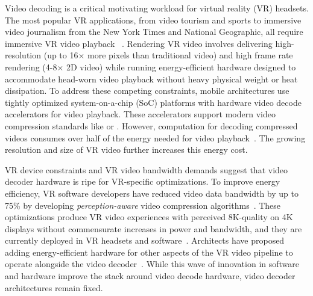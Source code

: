 
Video decoding is a critical motivating workload for virtual reality (VR) headsets.
The most popular VR applications, from \threesixty video tourism and sports to immersive video journalism from the New York Times and National Geographic, all require immersive VR video playback ~\cite{nytvr,nationalgeographic-vr}.
Rendering VR video involves delivering high-resolution (up to 16$\times$ more pixels than traditional video) and high frame rate rendering (4-8$\times$ 2D video) while running energy-efficient hardware designed to accommodate head-worn video playback without heavy physical weight or heat dissipation.
To address these competing constraints, mobile architectures use tightly optimized system-on-a-chip (SoC) platforms with hardware video decode accelerators for video playback.
These accelerators support modern video compression standards like \hevc or \vpnine.
However, computation for decoding compressed videos consumes over half of the energy needed for video playback~\cite{google2018asplos,hevcThesis}.
The growing resolution and size of VR video further increases this energy cost.

\foveatedExampleFigure

VR device constraints and VR video bandwidth demands suggest that video decoder hardware is ripe for VR-specific optimizations.
To improve energy efficiency, VR software developers have reduced video data bandwidth by up to 75\% by developing \emph{perception-aware} video compression algorithms~\cite{guenter2012foveated,patney2017perceptual, visualcloud2017haynes,rubiks,fov-cloud-ryoo}.
These optimizations produce VR video experiences with perceived 8K-quality on 4K displays without commensurate increases in power and bandwidth, and they are currently deployed in VR headsets and software~\cite{htc-vive-pro-eye, patney2017perceptual, kaplanyan2019deepfovea}.
Architects have proposed adding energy-efficient hardware for other aspects of the VR video pipeline to operate alongside the video decoder~\cite{evr19isca, leng2018semantic, xie2018perception, zhang2017race}.
While this wave of innovation in software and hardware improve the stack around video decode hardware, video decoder architectures remain fixed.

